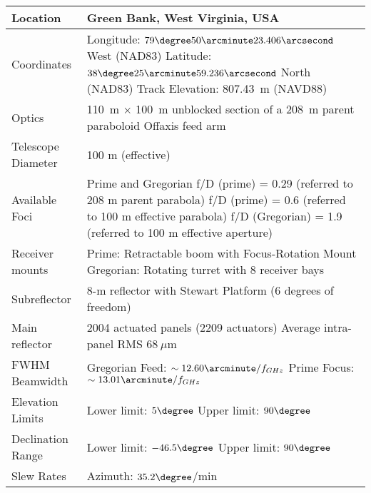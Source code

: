 \begin{table}[!h]
\begin{center}
\begin{tabular}{p{.25\linewidth}p{.6\linewidth}}
\toprule
Location & Green Bank, West Virginia, USA \\
\midrule
Coordinates & Longitude: $79\degree 50\arcminute 23.406\arcsecond$ West (\gls{NAD83})\newline
              Latitude: $38\degree 25\arcminute 59.236\arcsecond$ North (\gls{NAD83})\newline
              Track Elevation: 807.43~m (\gls{NAVD88})\\
\midrule
Optics & 110~m $\times$ 100~m unblocked section of a 208~m parent paraboloid Offaxis feed arm\\
\midrule
Telescope Diameter & 	100 m (effective) \\
\midrule
Available Foci & Prime and Gregorian \newline
                 f/D (prime) = 0.29 (referred to 208 m parent parabola) \newline
                 f/D (prime) = 0.6 (referred to 100 m effective parabola) \newline
                 f/D (Gregorian) = 1.9 (referred to 100 m effective aperture) \\
\midrule
Receiver mounts & Prime: Retractable boom with Focus-Rotation Mount \newline
                  Gregorian: Rotating turret with 8 receiver bays \\
\midrule
Subreflector & 	8-m reflector with Stewart Platform (6 degrees of freedom) \\
\midrule
Main reflector & 2004 actuated panels (2209 actuators) \newline
                 Average intra-panel RMS $68~\mu$m \\
\midrule
FWHM Beamwidth & Gregorian Feed: $\sim{ 12.60\arcminute / f_{GHz}}$ \newline
                 Prime Focus: $\sim {13.01\arcminute / f_{GHz}}$ \\
\midrule
Elevation Limits & Lower limit: $5\degree$ \newline
                   Upper limit: $90\degree$ \\
\midrule
Declination Range  & Lower limit: $-46.5\degree$ \newline
                     Upper limit: $90\degree$ \\
\midrule
Slew Rates & Azimuth:	$35.2\degree$/min \newline

\end{tabular}
\end{center}
\end{table}
